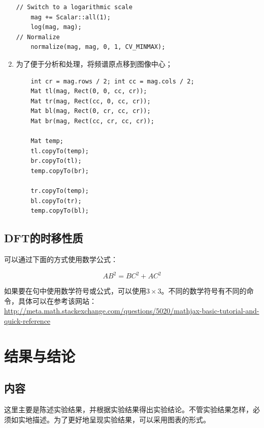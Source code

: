 \documentclass[hyperref,UTF8]{ctexart}
\begin{document}
\begin{enumerate}
\begin{lstlisting}
// Switch to a logarithmic scale
	mag += Scalar::all(1);
	log(mag, mag);
// Normalize
	normalize(mag, mag, 0, 1, CV_MINMAX);
\end{lstlisting}
\item 为了便于分析和处理，将频谱原点移到图像中心；

\begin{lstlisting}
	int cr = mag.rows / 2; int cc = mag.cols / 2;
	Mat tl(mag, Rect(0, 0, cc, cr));
	Mat tr(mag, Rect(cc, 0, cc, cr));
	Mat bl(mag, Rect(0, cr, cc, cr));
	Mat br(mag, Rect(cc, cr, cc, cr));

	Mat temp;
	tl.copyTo(temp);
	br.copyTo(tl);
	temp.copyTo(br);

	tr.copyTo(temp);
	bl.copyTo(tr);
	temp.copyTo(bl);

\end{lstlisting}

\end{enumerate}


\subsection{DFT的时移性质}



可以通过下面的方式使用数学公式：

\begin{equation}
AB^2 = BC^2 + AC^2
\end{equation}

如果要在句中使用数学符号或公式，可以使用$3 \times 3$。不同的数学符号有不同的命令，具体可以在参考该网站：\url{http://meta.math.stackexchange.com/questions/5020/mathjax-basic-tutorial-and-quick-reference}

\section{结果与结论}

\subsection{内容}

这里主要是陈述实验结果，并根据实验结果得出实验结论。不管实验结果怎样，必须如实地描述。为了更好地呈现实验结果，可以采用图表的形式。
\end{document}

